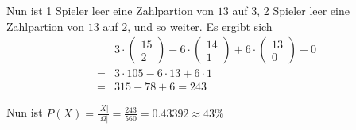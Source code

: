 \documentclass[11pt,a4paper,ngerman]{article}
\begin{document}
Nun ist 1 Spieler leer eine Zahlpartion von $13$ auf $3$, 2 Spieler leer eine Zahlpartion von $13$ auf $2$, und so weiter. Es ergibt sich
\[\begin{array}{ll}
    &3 \cdot \begin{pmatrix} 15 \\ 2\end{pmatrix} - 6 \cdot \begin{pmatrix} 14 \\ 1 \end{pmatrix} + 6 \cdot \begin{pmatrix} 13 \\ 0 \end{pmatrix} - 0\\
    = & 3 \cdot 105 - 6 \cdot 13 + 6 \cdot 1\\
    = & 315 - 78 + 6 = 243
\end{array}\]

Nun ist $P(X) = \frac{|X|}{|\Omega|} = \frac{243}{560} = 0.43392 \approx 43 \%$


\label{LastPage}
\end{document}
